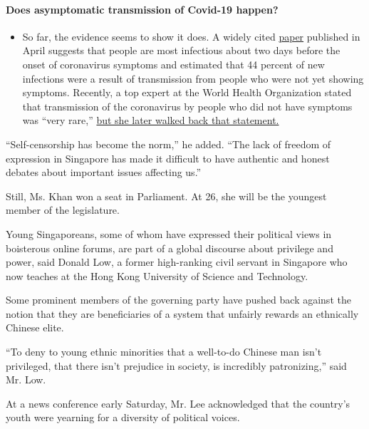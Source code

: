 \begin{itemize}
{  \paragraph{Does asymptomatic transmission of Covid-19
  happen?}\label{does-asymptomatic-transmission-of-covid-19-happen}}

  \begin{itemize}
  \tightlist
  \item
    So far, the evidence seems to show it does. A widely cited
    \href{https://www.nature.com/articles/s41591-020-0869-5}{paper}
    published in April suggests that people are most infectious about
    two days before the onset of coronavirus symptoms and estimated that
    44 percent of new infections were a result of transmission from
    people who were not yet showing symptoms. Recently, a top expert at
    the World Health Organization stated that transmission of the
    coronavirus by people who did not have symptoms was ``very rare,''
    \href{https://www.nytimes3xbfgragh.onion/2020/06/09/world/coronavirus-updates.html?action=click\&pgtype=Article\&state=default\&region=MAIN_CONTENT_3\&context=storylines_faq\#link-1f302e21}{but
    she later walked back that statement.}
  \end{itemize}
\end{itemize}

``Self-censorship has become the norm,'' he added. ``The lack of freedom
of expression in Singapore has made it difficult to have authentic and
honest debates about important issues affecting us.''

Still, Ms. Khan won a seat in Parliament. At 26, she will be the
youngest member of the legislature.

Young Singaporeans, some of whom have expressed their political views in
boisterous online forums, are part of a global discourse about privilege
and power, said Donald Low, a former high-ranking civil servant in
Singapore who now teaches at the Hong Kong University of Science and
Technology.

Some prominent members of the governing party have pushed back against
the notion that they are beneficiaries of a system that unfairly rewards
an ethnically Chinese elite.

``To deny to young ethnic minorities that a well-to-do Chinese man isn't
privileged, that there isn't prejudice in society, is incredibly
patronizing,'' said Mr. Low.

At a news conference early Saturday, Mr. Lee acknowledged that the
country's youth were yearning for a diversity of political voices.

